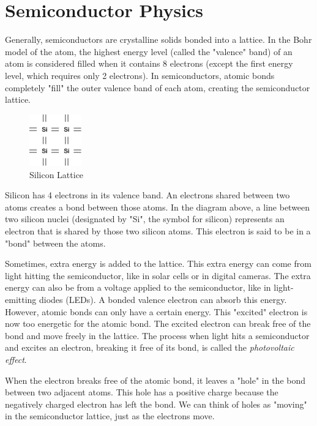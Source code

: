 \section{Semiconductor Physics}


Generally, semiconductors are crystalline solids bonded into a lattice. In the Bohr model of the atom, the highest energy level (called the "valence" band) of an atom is considered filled when it contains 8 electrons (except the first energy level, which requires only 2 electrons). In semiconductors, atomic bonds completely "fill" the outer valence band of each atom, creating the semiconductor lattice.

	\begin{figure}[H]{
		\centering
		\includegraphics[width=0.2\textwidth]{n_led/si_lattice.png}
		\caption{Silicon Lattice}
		\vspace{-5mm}}
	\label{fig:SiLattice}
\end{figure}

Silicon has 4 electrons in its valence band. An electrons shared between two atoms creates a bond between those atoms. In the diagram above, a line between two silicon nuclei (designated by "Si", the symbol for silicon) represents an electron that is shared by those two silicon atoms. This electron is said to be in a "bond" between the atoms.

Sometimes, extra energy is added to the lattice. This extra energy can come from light hitting the semiconductor, like in solar cells or in digital cameras. The extra energy can also be from a voltage applied to the semiconductor, like in light-emitting diodes (LEDs). A bonded valence electron can absorb this energy. However, atomic bonds can only have a certain energy. This "excited" electron is now too energetic for the atomic bond. The excited electron can break free of the bond and move freely in the lattice. The process when light hits a semiconductor and excites an electron, breaking it free of its bond, is called the \textit{photovoltaic effect}.

When the electron breaks free of the atomic bond, it leaves a "hole" in the bond between two adjacent atoms. This hole has a positive charge because the negatively charged electron has left the bond. We can think of holes as "moving" in the semiconductor lattice, just as the electrons move. 

